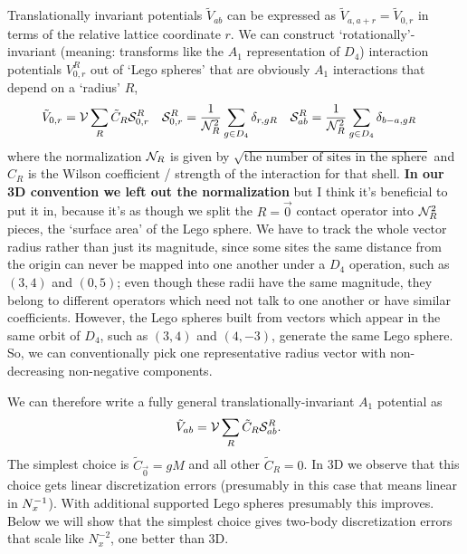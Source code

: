 Translationally invariant potentials $\tilde{V}_{ab}$ can be expressed as $\tilde{V}_{a,a+r} = \tilde{V}_{0,r}$  in terms of the relative lattice coordinate $r$.
We can construct `rotationally'-invariant (meaning: transforms like the $A_1$ representation of $D_4$) interaction potentials $V^R_{0,r}$ out of `Lego spheres'  that are obviously $A_1$ interactions that depend on a `radius' $R$,
\begin{align}
	\tilde{V}_{0,r} &= \mathcal{V} \sum_{R} \tilde{C}_R \mathcal{S}^{R}_{0,r}
    &
    \mathcal{S}^{R}_{0,r} &= \frac{1}{\mathcal{N}_{R}^2}\sum_{g \in D_4} \delta_{r, gR}
    &
    \mathcal{S}^{R}_{ab} &= \frac{1}{\mathcal{N}_{R}^2}\sum_{g \in D_4} \delta_{b-a,gR}
    \label{eq:Lego sphere}
\end{align}
where the normalization $\mathcal{N}_{R}$ is given by $\sqrt{\textrm{the number of sites in the sphere}}$ and $C_R$ is the Wilson coefficient / strength of the interaction for that shell.
{\bf In our 3D convention we left out the normalization} but I think it's beneficial to put it in, because it's as though we split the $R=\vec{0}$ contact operator into $\mathcal{N}_{R}^2$ pieces, the `surface area' of the Lego sphere.
We have to track the whole vector radius rather than just its magnitude, since some sites the same distance from the origin can never be mapped into one another under a $D_4$ operation, such as $(3,4)$ and $(0,5)$; even though these radii have the same magnitude, they belong to different operators which need not talk to one another or have similar coefficients.
However, the Lego spheres built from vectors which appear in the same orbit of $D_4$, such as $(3,4)$ and $(4,-3)$, generate the same Lego sphere.
So, we can conventionally pick one representative radius vector with non-decreasing non-negative components.

We can therefore write a fully general translationally-invariant $A_1$ potential as
\begin{align}
	\tilde{V}_{ab} &= \mathcal{V} \sum_{R} \tilde{C}_R \mathcal{S}^{R}_{ab}.
\end{align}
The simplest choice is $\tilde{C}_{\vec{0}} = gM$ and all other $\tilde{C}_R=0$.
In 3D we observe that this choice gets linear discretization errors (presumably in this case that means linear in $N_x^{-1}$).
With additional supported Lego spheres presumably this improves.
Below we will show that the simplest choice gives two-body discretization errors that scale like $N_x^{-2}$, one better than 3D.
